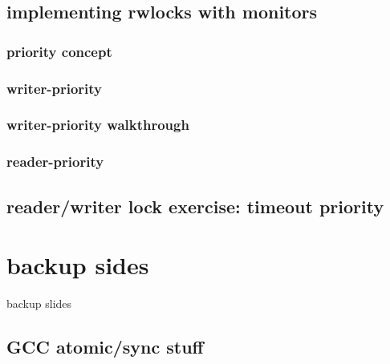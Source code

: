 

\subsection{implementing rwlocks with monitors}



\subsubsection{priority concept}



\subsubsection{writer-priority}



\subsubsection{writer-priority walkthrough}


\subsubsection{reader-priority}



\subsection{reader/writer lock exercise: timeout priority}





\section{backup sides}
\begin{frame}{}
\end{frame}

\begin{frame}{backup slides}
\end{frame}


\subsection{GCC atomic/sync stuff}


